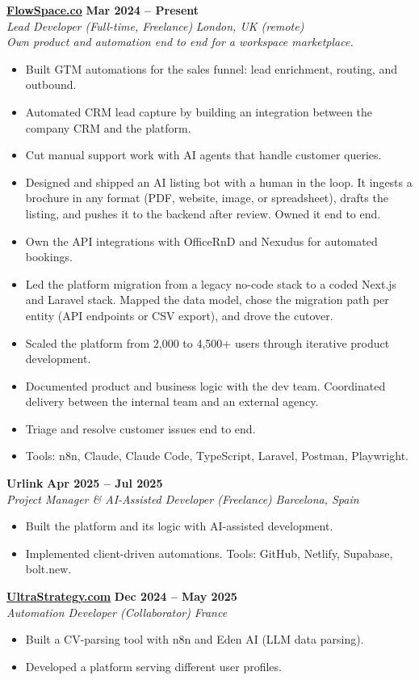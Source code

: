 \documentclass[a4paper,10pt]{article}
\newcommand{\role}[4]{%
 \textbf{#1} \hfill \textbf{#2}\\[1pt]%
 \textit{#3} \hfill \textit{#4}\\[2pt]%
}
\begin{document}
\role{\href{https://flowspace.co}{FlowSpace.co}}{Mar 2024 -- Present}{Lead Developer (Full-time, Freelance)}{London, UK (remote)}
\textit{Own product and automation end to end for a workspace marketplace.}
\begin{itemize}
 \item Built GTM automations for the sales funnel: lead enrichment, routing, and outbound.
 \item Automated CRM lead capture by building an integration between the company CRM and the platform.
 \item Cut manual support work with AI agents that handle customer queries.
 \item Designed and shipped an AI listing bot with a human in the loop. It ingests a brochure in any format (PDF, website, image, or spreadsheet), drafts the listing, and pushes it to the backend after review. Owned it end to end.
 \item Own the API integrations with OfficeRnD and Nexudus for automated bookings.
 \item Led the platform migration from a legacy no-code stack to a coded Next.js and Laravel stack. Mapped the data model, chose the migration path per entity (API endpoints or CSV export), and drove the cutover.
 \item Scaled the platform from 2,000 to 4,500+ users through iterative product development.
 \item Documented product and business logic with the dev team. Coordinated delivery between the internal team and an external agency.
 \item Triage and resolve customer issues end to end.
 \item Tools: n8n, Claude, Claude Code, TypeScript, Laravel, Postman, Playwright.
\end{itemize}

\role{Urlink}{Apr 2025 -- Jul 2025}{Project Manager \& AI-Assisted Developer (Freelance)}{Barcelona, Spain}
\begin{itemize}
 \item Built the platform and its logic with AI-assisted development.
 \item Implemented client-driven automations. Tools: GitHub, Netlify, Supabase, bolt.new.
\end{itemize}

\role{\href{https://ultrastrategy.com}{UltraStrategy.com}}{Dec 2024 -- May 2025}{Automation Developer (Collaborator)}{France}
\begin{itemize}
 \item Built a CV-parsing tool with n8n and Eden AI (LLM data parsing).
 \item Developed a platform serving different user profiles.
\end{itemize}
\end{document}
